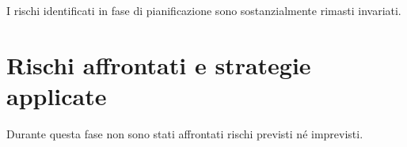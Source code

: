 I rischi identificati in fase di pianificazione sono sostanzialmente rimasti invariati.

\section{Rischi affrontati e strategie applicate}
Durante questa fase non sono stati affrontati rischi previsti né imprevisti.